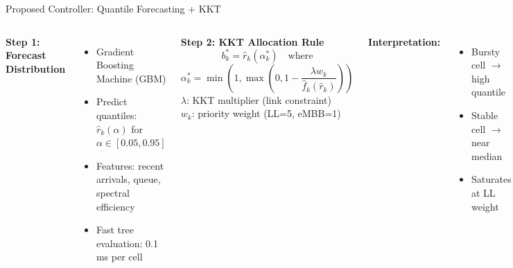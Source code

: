 \documentclass[aspectratio=169]{beamer}
\begin{document}
\begin{frame}{Proposed Controller: Quantile Forecasting + KKT}
\begin{columns}
\textbf{Step 1: Forecast Distribution}
\begin{itemize}
    \item Gradient Boosting Machine (GBM)
    \item Predict quantiles: $\hat{r}_k(\alpha)$ for $\alpha \in [0.05, 0.95]$
    \item Features: recent arrivals, queue, spectral efficiency
    \item Fast tree evaluation: 0.1 ms per cell
\end{itemize}

\textbf{Step 2: KKT Allocation Rule}
\begin{equation*}
b_k^* = \hat{r}_k(\alpha_k^*) \quad \text{where}
\end{equation*}
\begin{equation*}
\alpha_k^* = \min\left(1, \max\left(0, 1 - \frac{\lambda w_k}{\hat{f}_k(\hat{r}_k)}\right)\right)
\end{equation*}
$\lambda$: KKT multiplier (link constraint)\\
$w_k$: priority weight (LL=5, eMBB=1)


\vspace{0.3cm}
\textbf{Interpretation:}
\begin{itemize}
    \item Bursty cell $\rightarrow$ high quantile
    \item Stable cell $\rightarrow$ near median
    \item Saturates at LL weight
\end{itemize}
\end{columns}
\end{frame}
\end{document}
